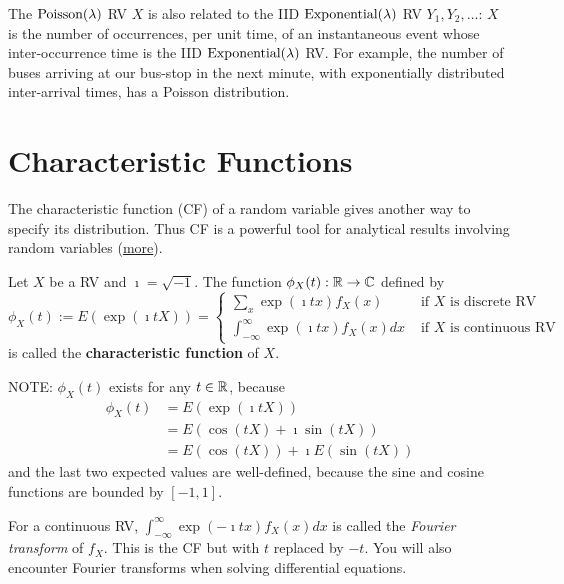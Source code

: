 The $\mbox{{\rm Poisson}}(\lambda)$ RV $X$ is also related to the IID $\mbox{{\rm Exponential}}(\lambda)$ RV $Y_1,Y_2,\ldots$: $X$ is the number of occurrences, per unit time, of an instantaneous event whose inter-occurrence time is the IID $\mbox{{\rm Exponential}}(\lambda)$ RV.  For example, the number of buses arriving at our bus-stop in the next minute, with exponentially distributed inter-arrival times, has a Poisson distribution.

\section{Characteristic Functions}
The characteristic function (CF) of a random variable gives another way to specify its distribution. 
Thus CF is a powerful tool for analytical results involving random variables
(\href{http://en.wikipedia.org/wiki/Characteristic_function_(probability_theory)}{more}).

\begin{definition}
Let $X$ be a RV and $\imath=\sqrt{-1}$. The function $\phi_X(t) : \mathbb{R} \to \mathbb{C}$ defined by
\begin{equation}\label{E:CF}
\boxed{
\phi_X(t) := E \left( \exp \left( \imath t X\right) \right) = 
\begin{cases}
\sum_{x} \exp \left( \imath t x\right) f_X(x) & \text{ if $X$ is discrete RV}\\
\int_{-\infty}^{\infty} \exp \left( \imath t x\right) f_X(x) dx & \text{ if $X$ is continuous RV}
\end{cases}
}
\end{equation}
is called the {\bf characteristic function} of $X$.
\end{definition}

NOTE: 
$\phi_X(t)$ exists for any $t \in \mathbb{R}$, because
\begin{align*}
\phi_X(t) 
&= E \left( \exp \left( \imath t X\right) \right) \\
&= E \left( \cos(tX)+ \imath \sin(tX) \right)\\
&= E \left( \cos(tX) \right) + \imath E \left(\sin(tX) \right)
\end{align*}
and the last two expected values are well-defined, because the sine and cosine functions are bounded by $[-1,1]$.

For a continuous RV, $\int_{-\infty}^{\infty} \exp \left(- \imath t x\right) f_X(x) dx$ is called the {\em Fourier transform} of $f_X$.  
This is the CF but with $t$ replaced by $-t$.  
You will also encounter Fourier transforms when solving differential equations.


